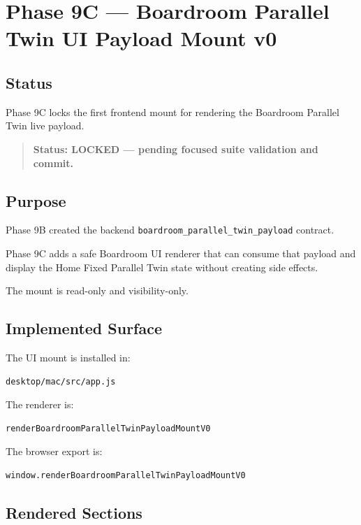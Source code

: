 \section{Phase 9C --- Boardroom Parallel Twin UI Payload Mount v0}
\label{sec:aion-boardroom-parallel-twin-payload-mount-v0}

\subsection{Status}

Phase 9C locks the first frontend mount for rendering the Boardroom Parallel Twin live payload.

\begin{quote}
\textbf{Status: LOCKED --- pending focused suite validation and commit.}
\end{quote}

\subsection{Purpose}

Phase 9B created the backend \texttt{boardroom\_parallel\_twin\_payload} contract.

Phase 9C adds a safe Boardroom UI renderer that can consume that payload and display the Home Fixed Parallel Twin state without creating side effects.

The mount is read-only and visibility-only.

\subsection{Implemented Surface}

The UI mount is installed in:

\begin{verbatim}
desktop/mac/src/app.js
\end{verbatim}

The renderer is:

\begin{verbatim}
renderBoardroomParallelTwinPayloadMountV0
\end{verbatim}

The browser export is:

\begin{verbatim}
window.renderBoardroomParallelTwinPayloadMountV0
\end{verbatim}

\subsection{Rendered Sections}

